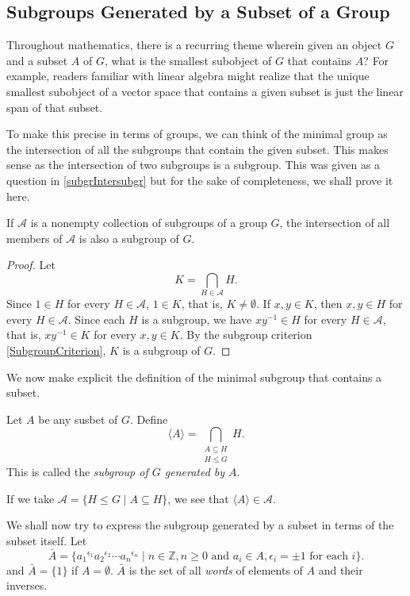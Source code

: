 \subsection{Subgroups Generated by a Subset of a Group}

Throughout mathematics, there is a recurring theme wherein given an object $G$ and a subset $A$ of $G$, what is the smallest subobject of $G$ that contains $A$? For example, readers familiar with linear algebra might realize that the unique smallest subobject of a vector space that contains a given subset is just the linear span of that subset.

To make this precise in terms of groups, we can think of the minimal group as the intersection of all the subgroups that contain the given subset. This makes sense as the intersection of two subgroups is a subgroup. This was given as a question in \ref{subgrIntersubgr} but for the sake of completeness, we shall prove it here.

\begin{theorem}
\label{IntersectionOfSubgroups}
    If $\mathcal{A}$ is a nonempty collection of subgroups of a group $G$, the intersection of all members of $\mathcal{A}$ is also a subgroup of $G$.
\end{theorem}
\begin{proof}
    Let $$K=\bigcap_{H\in\mathcal{A}}H.$$
    Since $1\in H$ for every $H\in\mathcal{A}$, $1\in K$, that is, $K\neq\emptyset$. If $x,y\in K$, then $x,y\in H$ for every $H\in\mathcal{A}$. Since each $H$ is a subgroup, we have $xy^{-1}\in H$ for every $H\in\mathcal{A}$, that is, $xy^{-1}\in K$ for every $x,y\in K$. By the subgroup criterion \ref{SubgroupCriterion}, $K$ is a subgroup of $G$.
\end{proof}

We now make explicit the definition of the minimal subgroup that contains a subset.
\begin{definition}
    Let $A$ be any susbet of $G$. Define
    $$\langle A\rangle=\bigcap_{\substack{A\subseteq H \\ H\leq G}}H.$$
    This is called the \textit{subgroup of $G$ generated by $A$}.
\end{definition}

If we take $\mathcal{A}=\{H\leq G\mid A\subseteq H\}$, we see that $\langle A\rangle\in\mathcal{A}$.

We shall now try to express the subgroup generated by a subset in terms of the subset itself. Let
$$\bar{A} = \{{a_1}^{\epsilon_1}{a_2}^{\epsilon_2}\cdots{a_n}^{\epsilon_n}\mid  n\in\mathbb{Z}, n\geq0\text{ and }a_i\in A,\epsilon_i=\pm1\text{ for each }i\}.$$
and $\bar A=\{1\}$ if $A=\emptyset$. $\bar A$ is the set of all \textit{words} of elements of $A$ and their inverses.

